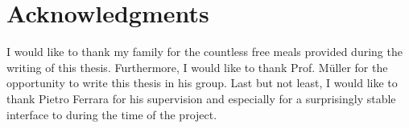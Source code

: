 %

\chapter*{Acknowledgments}
	\label{Acknowledgments}

	I would like to thank my family for the countless free meals provided during the writing of this thesis. Furthermore, I would like to thank Prof. M\"uller for the opportunity to write this thesis in his group. Last but not least, I would like to thank Pietro Ferrara for his supervision and especially for a surprisingly stable interface to \sample during the time of the project.


